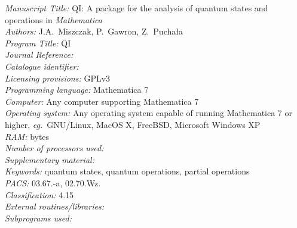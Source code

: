 \documentclass[a4paper,11pt]{elsart}
\newcommand{\Mathematica}{\emph{Mathematica}}
\newcommand{\1}{{\rm 1\hspace{-0.9mm}l}}
\newcommand{\qi}{QI}
\newcommand{\eg}{\emph{eg.}}
\begin{document}
\begin{small}
\noindent
{\em Manuscript Title:} \qi: A package for the analysis of quantum states and operations in
\Mathematica\\
{\em Authors:} J.A.~Miszczak, P.~Gawron, Z.~Pucha{\l}a \\
{\em Program Title:} QI \\
{\em Journal Reference:}                                      \\
{\em Catalogue identifier:}                                   \\
{\em Licensing provisions:} GPLv3 \\
{\em Programming language:} Mathematica 7\\
{\em Computer:} Any computer supporting Mathematica 7\\
{\em Operating system:} Any operating system capable of running Mathematica 7 or higher, \eg\ GNU/Linux, MacOS X, FreeBSD, Microsoft Windows XP\\
{\em RAM:} bytes                                              \\
{\em Number of processors used:}                              \\
{\em Supplementary material:}                                 \\
{\em Keywords:} quantum states, quantum operations, partial operations  \\
{\em PACS:} 03.67.-a, 02.70.Wz.\\
{\em Classification:} 4.15 \\
{\em External routines/libraries:}                                      \\
{\em Subprograms used:}                                       \\


\end{small}
\end{document}
